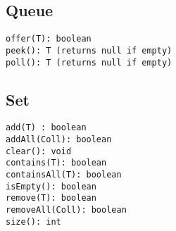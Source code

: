 \documentclass[11pt]{article}
\begin{document}
\begin{multicols*}{2}
\subsection{Queue}
\label{sec:org2e78e3d}
\begin{verbatim}
offer(T): boolean
peek(): T (returns null if empty)
poll(): T (returns null if empty)
\end{verbatim}
\subsection{Set}
\label{sec:org216edf6}
\begin{verbatim}
add(T) : boolean
addAll(Coll): boolean
clear(): void
contains(T): boolean
containsAll(T): boolean
isEmpty(): boolean
remove(T): boolean
removeAll(Coll): boolean
size(): int
\end{verbatim}

\end{multicols*}
\end{document}
